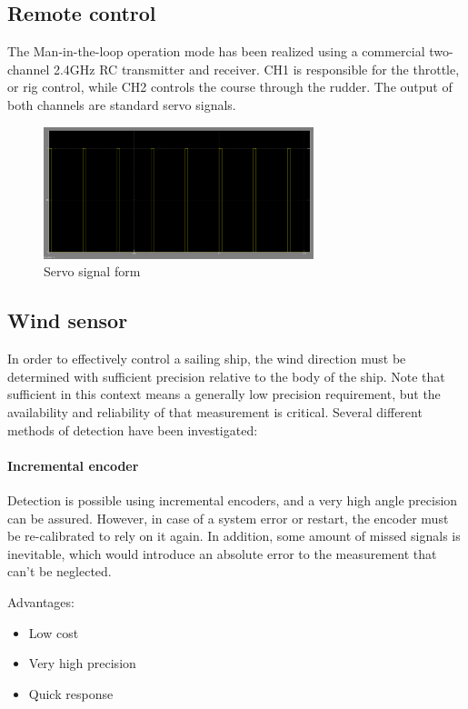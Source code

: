 \subsection{Remote control}

The Man-in-the-loop operation mode has been realized using a commercial two-channel 2.4GHz RC transmitter and receiver. CH1 is responsible for the throttle, or rig control, while CH2 controls the course through the rudder. The output of both channels are standard servo signals.

\begin{figure}[H]
	\centering
	\includegraphics[width=0.7\textwidth]{fig/servosignal}
	\caption{Servo signal form}
	\label{fig:Servosignal}
\end{figure}

\subsection{Wind sensor}

In order to effectively control a sailing ship, the wind direction must be determined with sufficient precision relative to the body of the ship. Note that sufficient in this context means a generally low precision requirement, but the availability and reliability of that measurement is critical. Several different methods of detection have been investigated:

\paragraph{Incremental encoder} Detection is possible using incremental encoders, and a very high angle precision can be assured. However, in case of a system error or restart, the encoder must be re-calibrated to rely on it again. In addition, some amount of missed signals is inevitable, which would introduce an absolute error to the measurement that can't be neglected.

Advantages:
\begin{itemize}
\item Low cost
\item Very high precision
\item Quick response
\end{itemize}

